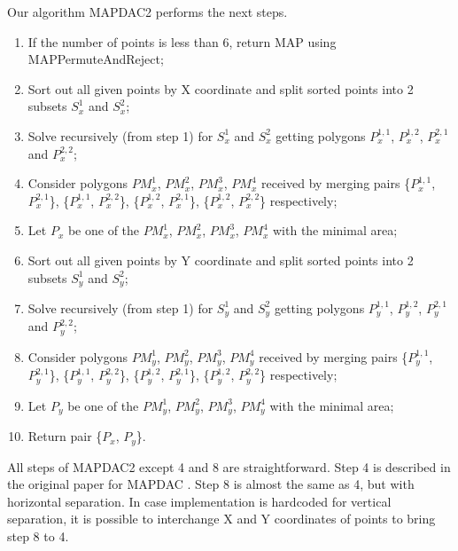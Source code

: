 \documentclass[conference]{IEEEtran}
\begin{document}
			Our algorithm MAP{\textunderscore}DAC2 performs the next steps.
			\begin{enumerate}
				\item If the number of points is less than 6, return MAP using MAP{\textunderscore}PermuteAndReject;
				\item Sort out all given points by X coordinate and split sorted points into 2 subsets $S_{x}^{1}$ and $S_{x}^{2}$;
				\item Solve recursively (from step 1) for $S_{x}^{1}$ and $S_{x}^{2}$ getting polygons $P_{x}^{1,1}$, $P_{x}^{1,2}$, $P_{x}^{2,1}$ and $P_{x}^{2,2}$;
				\item Consider polygons $PM_{x}^{1}$, $PM_{x}^{2}$, $PM_{x}^{3}$, $PM_{x}^{4}$ received by merging pairs 
				\{$P_{x}^{1,1}$, $P_{x}^{2,1}$\}, 
				\{$P_{x}^{1,1}$, $P_{x}^{2,2}$\}, 
				\{$P_{x}^{1,2}$, $P_{x}^{2,1}$\}, 
				\{$P_{x}^{1,2}$, $P_{x}^{2,2}$\} respectively;
				\item  Let $P_{x}$ be one of the $PM_{x}^{1}$, $PM_{x}^{2}$, $PM_{x}^{3}$, $PM_{x}^{4}$ with the minimal area;
				\item Sort out all given points by Y coordinate and split sorted points into 2 subsets $S_{y}^{1}$ and $S_{y}^{2}$;
				\item Solve recursively (from step 1) for $S_{y}^{1}$ and $S_{y}^{2}$ getting polygons $P_{y}^{1,1}$, $P_{y}^{1,2}$, $P_{y}^{2,1}$ and $P_{y}^{2,2}$;
				\item Consider polygons $PM_{y}^{1}$, $PM_{y}^{2}$, $PM_{y}^{3}$, $PM_{y}^{4}$ received by merging pairs 
				\{$P_{y}^{1,1}$, $P_{y}^{2,1}$\}, 
				\{$P_{y}^{1,1}$, $P_{y}^{2,2}$\}, 
				\{$P_{y}^{1,2}$, $P_{y}^{2,1}$\}, 
				\{$P_{y}^{1,2}$, $P_{y}^{2,2}$\} respectively;
				\item Let $P_{y}$ be one of the $PM_{y}^{1}$, $PM_{y}^{2}$, $PM_{y}^{3}$, $PM_{y}^{4}$ with the minimal area;
				\item Return pair \{$P_{x}$, $P_{y}$\}.
			\end {enumerate}
			
			All steps of MAP{\textunderscore}DAC2 except 4 and 8 are straightforward.
			Step 4 is described in the original paper for MAP{\textunderscore}DAC \cite{link13}.
			Step 8 is almost the same as 4, but with horizontal separation.
			In case implementation is hardcoded for vertical separation, it is possible to interchange X and Y coordinates of points to bring step 8 to 4.
		
\end{document}
